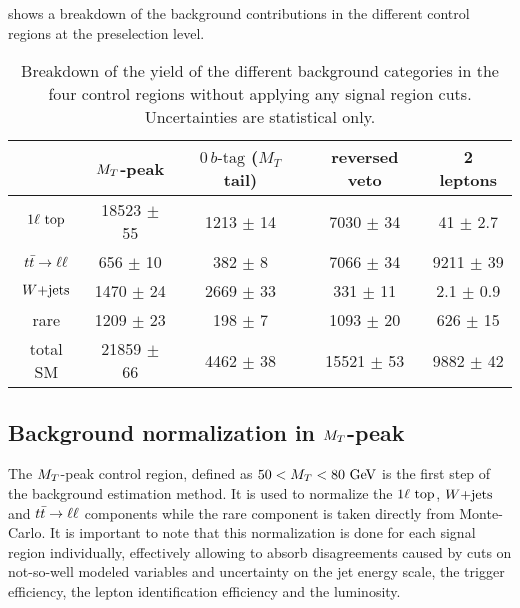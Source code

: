      shows a breakdown of the background contributions
    in the different control regions at the preselection level.

\begin{table}[h!]
    \centering
\begin{tabular}{|c|cccc|}
    \hline
                     & $M_T$-peak       & $0\, b\text{-tag}$ ($M_T$ tail) & reversed veto    & 2 leptons             \\
    \hline
     $1\ell~\text{top}$ & 18523 $\pm$ 55   &  1213 $\pm$ 14        &  7030 $\pm$ 34   &   41 $\pm$ 2.7  \\
     $t\bar{t} \rightarrow \ell \ell$  &   656 $\pm$ 10   &   382 $\pm$ 8         &  7066 $\pm$ 34   & 9211 $\pm$ 39   \\
     $\text{$W$+jets}$        &  1470 $\pm$ 24   &  2669 $\pm$ 33        &   331 $\pm$ 11   &  2.1 $\pm$ 0.9  \\
     rare            &  1209 $\pm$ 23   &   198 $\pm$ 7         &  1093 $\pm$ 20   &  626 $\pm$ 15   \\
    \hline
     total SM        & 21859 $\pm$ 66   &  4462 $\pm$ 38        & 15521 $\pm$ 53   & 9882 $\pm$ 42   \\
    \hline
\end{tabular}
    \caption{Breakdown of the yield of the different background categories in the four
    control regions without applying any signal region cuts. Uncertainties are statistical only.}
    \label{tab:cutflowControlRegions}
\end{table}

        \subsection{Background normalization in $M_T$-peak \label{sec:MTpeakNormalization}}

    The $M_T$-peak control region, defined as $50 < M_T < 80 ~\text{GeV}$ is the first step of the
    background estimation method. It is used to normalize the $1\ell~\text{top}$, $\text{$W$+jets}$ and
    $t\bar{t} \rightarrow \ell \ell$ components while the rare component is taken directly from Monte-Carlo.
    It is important to note that this normalization is done for each signal region individually,
    effectively allowing to absorb disagreements caused by cuts on not-so-well modeled
    variables and uncertainty on the jet energy scale, the trigger efficiency, the lepton
    identification efficiency and the luminosity.

